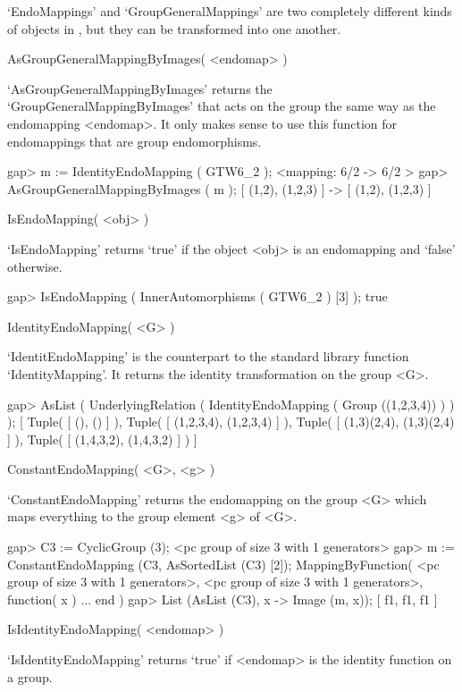 `EndoMappings' and `GroupGeneralMappings' are two completely different
kinds of objects in {\GAP}, but they can be transformed into one
another.

\>AsGroupGeneralMappingByImages( <endomap> )

`AsGroupGeneralMappingByImages' returns the
`GroupGeneralMappingByImages' that acts on the group the same way as
the endomapping <endomap>. It only makes sense to use this function
for endomappings that are group endomorphisms.

\beginexample
    gap> m := IdentityEndoMapping ( GTW6_2 );
    <mapping: 6/2 -> 6/2 >
    gap> AsGroupGeneralMappingByImages ( m );
    [ (1,2), (1,2,3) ] -> [ (1,2), (1,2,3) ]
\endexample

\>IsEndoMapping( <obj> )

`IsEndoMapping' returns `true' if the object <obj> is an endomapping
and `false' otherwise.

\beginexample
    gap> IsEndoMapping ( InnerAutomorphisms ( GTW6_2 ) [3] );
    true
\endexample

\>IdentityEndoMapping( <G> )

`IdentitEndoMapping' is the counterpart to the {\GAP} standard
library function `IdentityMapping'. It returns the identity
transformation on the group <G>.

\beginexample
    gap> AsList ( UnderlyingRelation ( IdentityEndoMapping ( Group ((1,2,3,4)) ) ) );
    [ Tuple( [ (), () ] ), Tuple( [ (1,2,3,4), (1,2,3,4) ] ), 
      Tuple( [ (1,3)(2,4), (1,3)(2,4) ] ), Tuple( [ (1,4,3,2), (1,4,3,2) ] ) 
     ]
\endexample

\>ConstantEndoMapping( <G>, <g> )

`ConstantEndoMapping' returns the endomapping on the group <G>
which maps everything to the group element <g> of <G>.

\beginexample
    gap> C3 := CyclicGroup (3);
    <pc group of size 3 with 1 generators>
    gap> m := ConstantEndoMapping (C3, AsSortedList (C3) [2]);
    MappingByFunction( <pc group of size 3 with 
    1 generators>, <pc group of size 3 with 
    1 generators>, function( x ) ... end )
    gap> List (AsList (C3), x -> Image (m, x));
    [ f1, f1, f1 ]
\endexample




\>IsIdentityEndoMapping( <endomap> )

`IsIdentityEndoMapping' returns `true' if <endomap> is the identity
function on a group.

